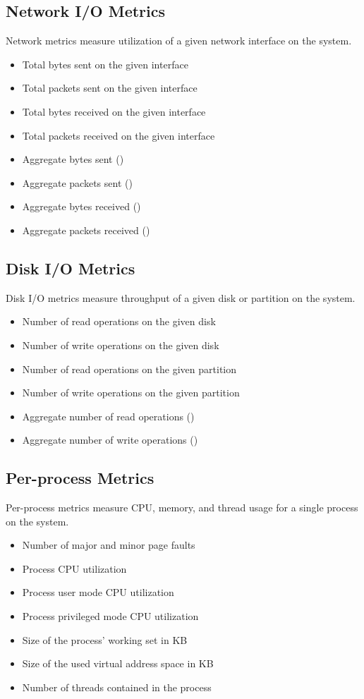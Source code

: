 \subsection{Network I/O Metrics}
Network metrics measure utilization of a given network interface on the system.
\begin{itemize}
\item Total bytes sent on the given interface 
\item Total packets sent on the given interface 
\item Total bytes received on the given interface 
\item Total packets received on the given interface 
\item Aggregate bytes sent (\dcamp) 
\item Aggregate packets sent (\dcamp) 
\item Aggregate bytes received (\dcamp) 
\item Aggregate packets received (\dcamp)
\end{itemize}

\subsection{Disk I/O Metrics}
Disk I/O metrics measure throughput of a given disk or partition on the system.
\begin{itemize}
\item Number of read operations on the given disk 
\item Number of write operations on the given disk 
\item Number of read operations on the given partition 
\item Number of write operations on the given partition 
\item Aggregate number of read operations (\dcamp) 
\item Aggregate number of write operations (\dcamp)
\end{itemize}

\subsection{Per-process Metrics}
Per-process metrics measure CPU, memory, and thread usage for a single process on the system.
\begin{itemize}
\item Number of major and minor page faults 
\item Process CPU utilization 
\item Process user mode CPU utilization 
\item Process privileged mode CPU utilization 
\item Size of the process' working set in KB 
\item Size of the used virtual address space in KB 
\item Number of threads contained in the process
\end{itemize}

